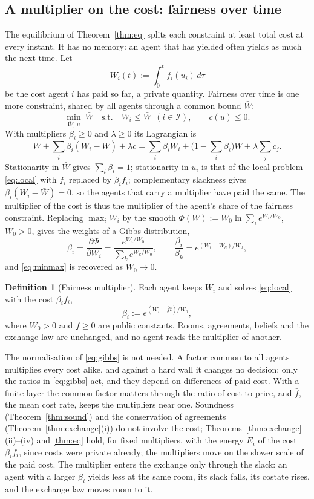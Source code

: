 \documentclass[11pt]{article}
\theoremstyle{definition}
\newtheorem{definition}[theorem]{Definition}
\theoremstyle{remark}
\newcommand{\I}{\mathcal{I}}
\begin{document}
\subsection{A multiplier on the cost: fairness over time}\label{sec:fair}
The equilibrium of Theorem~\ref{thm:eq} splits each constraint at least total cost at every instant. It has no memory: an agent that has yielded often yields as much the next time. Let
\[
W_i(t):=\int_0^tf_i(u_i)\,d\tau
\]
be the cost agent $i$ has paid so far, a private quantity. Fairness over time is one more constraint, shared by all agents through a common bound $\bar W$:
\begin{equation}\label{eq:minmax}
\min_{\bar W,\,u}\ \bar W\quad\text{s.t.}\quad W_i\le\bar W\ \ (i\in\I),\qquad c(u)\le0 .
\end{equation}
With multipliers $\beta_i\ge0$ and $\lambda\ge0$ its Lagrangian is
\[
\bar W+\sum_i\beta_i(W_i-\bar W)+\lambda c=\sum_i\beta_iW_i+\Big(1-\sum_i\beta_i\Big)\bar W+\lambda\sum_jc_j .
\]
Stationarity in $\bar W$ gives $\sum_i\beta_i=1$; stationarity in $u_i$ is that of the local problem \eqref{eq:local} with $f_i$ replaced by $\beta_if_i$; complementary slackness gives $\beta_i(W_i-\bar W)=0$, so the agents that carry a multiplier have paid the same. The multiplier of the cost is thus the multiplier of the agent's share of the fairness constraint. Replacing $\max_iW_i$ by the smooth $\Phi(W):=W_0\ln\sum_ie^{W_i/W_0}$, $W_0>0$, gives the weights of a Gibbs distribution,
\begin{equation}\label{eq:gibbs}
\beta_i=\frac{\partial\Phi}{\partial W_i}=\frac{e^{W_i/W_0}}{\sum_ke^{W_k/W_0}},\qquad\frac{\beta_i}{\beta_k}=e^{(W_i-W_k)/W_0},
\end{equation}
and \eqref{eq:minmax} is recovered as $W_0\to0$.

\begin{definition}[Fairness multiplier]\label{def:beta}
Each agent keeps $W_i$ and solves \eqref{eq:local} with the cost $\beta_if_i$,
\[
\beta_i:=e^{(W_i-\bar ft)/W_0},
\]
where $W_0>0$ and $\bar f\ge0$ are public constants. Rooms, agreements, beliefs and the exchange law are unchanged, and no agent reads the multiplier of another.
\end{definition}

The normalisation of \eqref{eq:gibbs} is not needed. A factor common to all agents multiplies every cost alike, and against a hard wall it changes no decision; only the ratios in \eqref{eq:gibbs} act, and they depend on differences of paid cost. With a finite layer the common factor matters through the ratio of cost to price, and $\bar f$, the mean cost rate, keeps the multipliers near one. Soundness (Theorem~\ref{thm:sound}) and the conservation of agreements (Theorem~\ref{thm:exchange}(i)) do not involve the cost; Theorems~\ref{thm:exchange}(ii)--(iv) and \ref{thm:eq} hold, for fixed multipliers, with the energy $E_i$ of the cost $\beta_if_i$, since costs were private already; the multipliers move on the slower scale of the paid cost. The multiplier enters the exchange only through the slack: an agent with a larger $\beta_i$ yields less at the same room, its slack falls, its costate rises, and the exchange law moves room to it.
\end{document}
